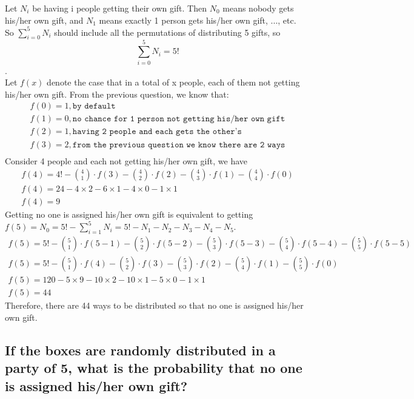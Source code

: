 \documentclass{article}
\begin{document}
Let \( N_i \) be having i people getting their own gift. Then \( N_0 \) means nobody gets his/her own gift, and \( N_1 \) means exactly 1 person gets his/her own gift, ..., etc. \\
So \( \sum_{i=0}^{5} N_i \) should include all the permutations of distributing 5 gifts, so \\
\[ \sum_{i=0}^{5} N_i = 5! \]. \\
Let \( f(x) \) denote the case that in a total of x people, each of them not getting his/her own gift. From the previous question, we know that:\\
\[
\begin{array}{ll}
f(0) = 1 ,\texttt{by default} \\
f(1) = 0, \texttt{no chance for 1 person not getting his/her own gift} \\
f(2) = 1, \texttt{having 2 people and each gets the other's} \\
f(3) = 2, \texttt{from the previous question we know there are 2 ways} \\
\end{array}
\]
Consider 4 people and each not getting his/her own gift, we have\\
\[
\begin{array}{ll}
f(4) = 4! - {4 \choose 1} \cdot f(3) - {4 \choose 2} \cdot f(2) - {4 \choose 3} \cdot f(1) - {4 \choose 4} \cdot f(0) \\
f(4) = 24 - 4 \times 2 - 6 \times 1 - 4 \times 0 - 1 \times 1\\
f(4) = 9
\end{array}
\]
Getting no one is assigned his/her own gift is equivalent to getting \( f(5) = N_0 = 5! - \sum_{i=1}^{5} N_i = 5! - N_1 - N_2 - N_3 - N_4 - N_5.\) \\
\[
\begin{array}{ll}
f(5) = 5! - {5 \choose 1} \cdot f(5-1) - {5 \choose 2} \cdot f(5-2) - {5 \choose 3} \cdot f(5-3) - {5 \choose 4} \cdot f(5-4) - {5 \choose 5} \cdot f(5-5) \\
f(5) = 5! - {5 \choose 1} \cdot f(4) - {5 \choose 2} \cdot f(3) - {5 \choose 3} \cdot f(2) - {5 \choose 4} \cdot f(1) - {5 \choose 5} \cdot f(0) \\
f(5) = 120 - 5 \times 9 - 10 \times 2 - 10 \times 1 - 5 \times 0 - 1 \times 1\\
f(5) = 44
\end{array}
\]
Therefore, there are 44 ways to be distributed so that no one is assigned his/her own gift.

\subsection{If the boxes are randomly distributed in a party of 5, what is the probability that no one is assigned
his/her own gift?}
\end{document}
